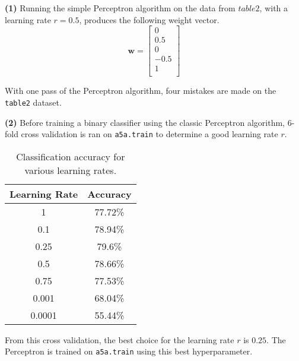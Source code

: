 \documentclass[11pt]{article}
\renewcommand\part[1]{\vspace{.10in}\textbf{(#1)}}
\begin{document}
\part{1} Running the simple Perceptron algorithm on the data from $table2$, with a learning rate $r = 0.5$, produces the following weight vector.
$$\mathbf{w} = \begin{bmatrix}
    0\\
    0.5\\
    0\\
    -0.5\\
    1\\
\end{bmatrix}$$

With one pass of the Perceptron algorithm, four mistakes are made on the \texttt{table2} dataset.


\part{2} Before training a binary classifier using the classic Perceptron algorithm, 6-fold cross validation is ran on \texttt{a5a.train} to determine a good learning rate $r$.
\begin{table}[H]
\centering
{\renewcommand{\arraystretch}{1.2}%
\begin{tabular}{| c | c |}
\hline
Learning Rate& Accuracy\\
\hline
1 & 77.72\%\\ \hline
0.1 & 78.94\%\\ \hline
0.25 & 79.6\%\\ \hline
0.5 & 78.66\%\\ \hline
0.75 & 77.53\%\\ \hline
0.001 & 68.04\%\\ \hline
0.0001 & 55.44\%\\ \hline
\end{tabular}}
\caption{Classification accuracy for various learning rates.}
\end{table}

From this cross validation, the best choice for the learning rate $r$ is $0.25$. The Perceptron is trained on \texttt{a5a.train} using this best hyperparameter. \newline

\newline
\end{document}
